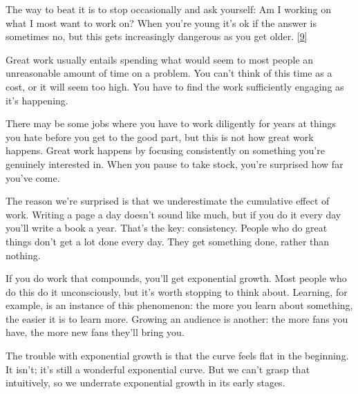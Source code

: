 The
                  way to beat it is to stop occasionally and ask yourself: Am I
                  working on what I most want to work on? When you're young it's
                  ok if the answer is sometimes no, but this gets increasingly
                  dangerous as you get older.
                  [\href{\#f9n}{9}]






                  Great work usually entails spending what would seem to most
                  people an unreasonable amount of time on a problem. You can't
                  think of this time as a cost, or it will seem too high. You
                  have to find the work sufficiently engaging as it's
                  happening.

There may be some jobs where you have to
                  work diligently for years at things you hate before you get to
                  the good part, but this is not how great work happens. Great
                  work happens by focusing consistently on something you're
                  genuinely interested in. When you pause to take stock, you're
                  surprised how far you've come.

The reason we're
                  surprised is that we underestimate the cumulative effect of
                  work. Writing a page a day doesn't sound like much, but if you
                  do it every day you'll write a book a year. That's the key:
                  consistency. People who do great things don't get a lot done
                  every day. They get something done, rather than nothing.

If
                  you do work that compounds, you'll get exponential growth.
                  Most people who do this do it unconsciously, but it's worth
                  stopping to think about. Learning, for example, is an instance
                  of this phenomenon: the more you learn about something, the
                  easier it is to learn more. Growing an audience is another:
                  the more fans you have, the more new fans they'll bring
                  you.

The trouble with exponential growth is that
                  the curve feels flat in the beginning. It isn't; it's still a
                  wonderful exponential curve. But we can't grasp that
                  intuitively, so we underrate exponential growth in its early
                  stages.

